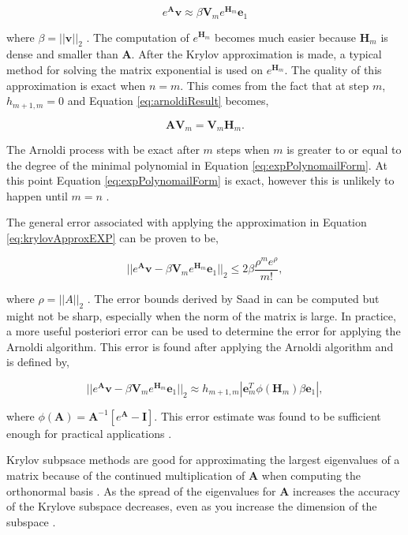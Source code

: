 \begin{equation}
    e^{\boldsymbol{A}}\boldsymbol{v} \approx \beta \boldsymbol{V}_{m}e^{\boldsymbol{H}_{m}}\boldsymbol{e}_{1}
    \label{eq:krylovApproxEXP}
\end{equation}

\noindent where $\beta = ||\boldsymbol{v}||_{2}$ \cite{saad1989}. The computation of $e^{
\boldsymbol{H}_{m}}$ becomes much easier because $\boldsymbol{H}_{m}$ is dense and smaller than $\boldsymbol{A}$. After the Krylov approximation is made, a typical method for solving the matrix exponential is used on $e^{\boldsymbol{H}_{m}}$. The quality of this approximation is exact when $n = m$. This comes from the fact that at step $m$, $h_{m+1,m} = 0$ and Equation \ref{eq:arnoldiResult} becomes,

\begin{equation}
    \boldsymbol{A}\boldsymbol{V}_{m} = \boldsymbol{V}_{m}\boldsymbol{H}_{m}.
\end{equation}

\noindent The Arnoldi process with be exact after $m$ steps when $m$ is greater to or equal to the degree of the minimal polynomial in Equation \ref{eq:expPolynomailForm}. At this point Equation \ref{eq:expPolynomailForm} is exact, however this is unlikely to happen until $m=n$ \cite{saad1992} \cite{saad1989}. 

 The general error associated with applying the approximation in Equation \ref{eq:krylovApproxEXP} can be proven to be,
 
 \begin{equation}
     ||e^{\boldsymbol{A}}\boldsymbol{v} - \beta \boldsymbol{V}_{m}e^{\boldsymbol{H}_{m}}\boldsymbol{e}_{1}||_{2} \leq 2\beta \frac{\rho^{m}e^{\rho}}{m!},
 \end{equation}
 
 \noindent where $\rho = ||A||_{2}$ \cite{saad1992}. The error bounds derived by Saad in \cite{saad1992} can be computed but might not be sharp, especially when the norm of the matrix is large. In practice, a more useful posteriori error can be used to determine the error for applying the Arnoldi algorithm. This error is found after applying the Arnoldi algorithm and is defined by,
 
\begin{equation}
    ||e^{\boldsymbol{A}}\boldsymbol{v} - \beta \boldsymbol{V}_{m}e^{\boldsymbol{H}_{m}}\boldsymbol{e}_{1}||_{2} \approx h_{m+1,m}|\boldsymbol{e}_{m}^{T}\phi(\boldsymbol{H}_{m})\beta \boldsymbol{e}_{1}|,
\end{equation}

\noindent where $\phi(\boldsymbol{A}) = \boldsymbol{A}^{-1}[e^{\boldsymbol{A}} - \boldsymbol{I}]$. This error estimate was found to be sufficient enough for practical applications \cite{saad1992}. 

Krylov subpsace methods are good for approximating the largest eigenvalues of a matrix because of the continued multiplication of $\boldsymbol{A}$ when computing the orthonormal basis \cite{akio2007}. As the spread of the eigenvalues for $\boldsymbol{A}$ increases the accuracy of the Krylove subspace decreases, even as you increase the dimension of the subspace \cite{pusa2010}. 